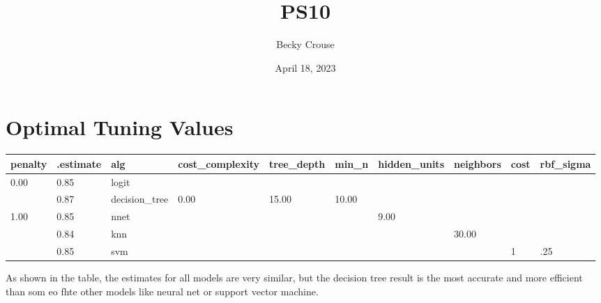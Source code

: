 \documentclass[nobib]{MSword}
\title{PS10}
\author{Becky Crouse}
\date{April 18, 2023}
\begin{document}
\maketitle

\section{Optimal Tuning Values}

\begin{table}[!ht]
    \centering
    \begin{tabular}{|l|l|l|l|l|l|l|l|l|l|}
    \hline
        penalty & .estimate & alg & cost\_complexity & tree\_depth & min\_n & hidden\_units & neighbors & cost & rbf\_sigma \\ \hline
        0.00 & 0.85 & logit & ~ & ~ & ~ & ~ & ~ & ~ & \\ \hline
        ~ & 0.87 & decision\_tree & 0.00 & 15.00 & 10.00 & ~ & ~ & ~ & \\ \hline
        1.00 & 0.85 & nnet & ~ & ~ & ~ & 9.00 & ~ & ~ & \\ \hline
        ~ & 0.84 & knn & ~ & ~ & ~ & ~ & 30.00 & ~ & \\ \hline
        ~ & 0.85 & svm & ~ & ~ & ~ & ~ & ~ & 1 & .25 \\ \hline
    \end{tabular}
\end{table}

As shown in the table, the estimates for all models are very similar, but the decision tree result is the most accurate and more efficient than som eo fhte other models like neural net or support vector machine.
\end{document}
